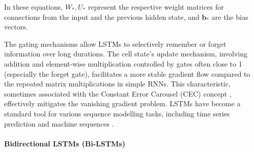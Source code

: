 In these equations, \( W_*, U_* \) represent the respective weight matrices for connections from the input and the previous hidden state, and \( \bm{b}_* \) are the bias vectors.

The gating mechanisms allow LSTMs to selectively remember or forget information over long durations. The cell state's update mechanism, involving addition and element-wise multiplication controlled by gates often close to 1 (especially the forget gate), facilitates a more stable gradient flow compared to the repeated matrix multiplications in simple RNNs. This characteristic, sometimes associated with the Constant Error Carousel (CEC) concept \autocite{hochreiter1997long}, effectively mitigates the vanishing gradient problem. LSTMs have become a standard tool for various sequence modelling tasks, including time series prediction and machine sequences \autocite{al2024rnn}.


\paragraph{\textbf{Bidirectional LSTMs (Bi-LSTMs)}}
\label{sec:bilstm}

